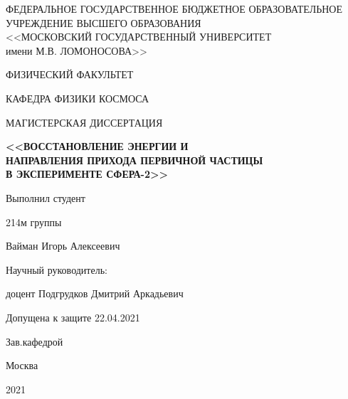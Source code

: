 \thispagestyle{empty}

\begin{center}
ФЕДЕРАЛЬНОЕ ГОСУДАРСТВЕННОЕ БЮДЖЕТНОЕ ОБРАЗОВАТЕЛЬНОЕ\\
УЧРЕЖДЕНИЕ ВЫСШЕГО ОБРАЗОВАНИЯ\\
<<МОСКОВСКИЙ ГОСУДАРСТВЕННЫЙ УНИВЕРСИТЕТ \\
имени М.В. ЛОМОНОСОВА>>\\

\vspace{5mm}

ФИЗИЧЕСКИЙ ФАКУЛЬТЕТ 

\vspace{5mm}

КАФЕДРА ФИЗИКИ КОСМОСА
\end{center}

\vfill
\begin{center}
{МАГИСТЕРСКАЯ ДИССЕРТАЦИЯ}
\end{center}


\begin{center}
{\bf <<ВОССТАНОВЛЕНИЕ ЭНЕРГИИ И \\НАПРАВЛЕНИЯ ПРИХОДА ПЕРВИЧНОЙ ЧАСТИЦЫ \\В ЭКСПЕРИМЕНТЕ СФЕРА-2>>
\par}

\end{center}

\vfill

\begin{flushright}
Выполнил студент

214м группы

Вайман Игорь Алексеевич

\vspace{15mm}

Научный руководитель:

доцент Подгрудков Дмитрий Аркадьевич
\end{flushright}

\vspace{10mm}

\begin{flushleft}
Допущена к защите 22.04.2021

Зав.кафедрой  

\end{flushleft}
\vfill
\begin{center}
Москва

2021
\end{center}

\newpage